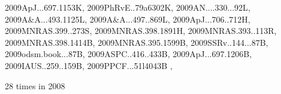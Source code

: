 \documentclass[12pt]{article}
\begin{document}
\begin{description}
{2009ApJ...697.1153K,%
2009PhRvE..79a6302K,%
2009AN....330...92L,%
2009A&A...493.1125L,%
2009A&A...497..869L,%
2009ApJ...706..712H,%
2009MNRAS.399..273S,%
2009MNRAS.398.1891H,%
2009MNRAS.393..113R,%
2009MNRAS.398.1414B,%
2009MNRAS.395.1599B,%
2009SSRv..144...87B,%
2009odsm.book...87B,%
2009ASPC..416..433B,%
2009ApJ...697.1206B,%
2009IAUS..259..159B,%
2009PPCF...51l4043B%
},\item
28 times in 2008 \citep{
2008A&A...491L..41L,%
2008A&A...479..883L,%
2008A&A...484...29G,%
2008A&A...490..743G,%
2008arXiv0809.4949G, %
2008A&A...490..501J,%
}
\end{description}
\end{document}
